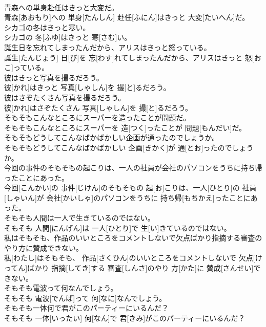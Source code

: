 \documentclass[8pt]{extreport}
\begin{document}
\begin{CJK}{UTF8}{min}
\\	青森への単身赴任はきっと大変だ。	
\\	青森[あおもり]への 単身[たんしん] 赴任[ふにん]はきっと 大変[たいへん]だ。
\\	シカゴの冬はきっと寒い。	
\\	シカゴの 冬[ふゆ]はきっと 寒[さむ]い。
\\	誕生日を忘れてしまったんだから、アリスはきっと怒っている。	
\\	誕生[たんじょう] 日[び]を 忘[わす]れてしまったんだから、アリスはきっと 怒[おこ]っている。
\\	彼はきっと写真を撮るだろう。	
\\	彼[かれ]はきっと 写真[しゃしん]を 撮[と]るだろう。
\\	彼はさぞたくさん写真を撮るだろう。	
\\	彼[かれ]はさぞたくさん 写真[しゃしん]を 撮[と]るだろう。
\\	そもそもこんなところにスーパーを造ったことが問題だ。	
\\	そもそもこんなところにスーパーを 造[つく]ったことが 問題[もんだい]だ。
\\	そもそもどうしてこんなばかばかしい企画が通ったのでしょうか。	
\\	そもそもどうしてこんなばかばかしい 企画[きかく]が 通[とお]ったのでしょうか。
\\	今回の事件のそもそもの起こりは、一人の社員が会社のパソコンをうちに持ち帰ったことにあった。	
\\	今回[こんかい]の 事件[じけん]のそもそもの 起[お]こりは、一人[ひとり]の 社員[しゃいん]が 会社[かいしゃ]のパソコンをうちに 持ち帰[もちかえ]ったことにあった。
\\	そもそも人間は一人で生きているのではない。	
\\	そもそも 人間[にんげん]は 一人[ひとり]で 生[い]きているのではない。
\\	私はそもそも、作品のいいところをコメントしないで欠点ばかり指摘する審査のやり方に賛成できない。	
\\	私[わたし]はそもそも、 作品[さくひん]のいいところをコメントしないで 欠点[けってん]ばかり 指摘[してき]する 審査[しんさ]のやり 方[かた]に 賛成[さんせい]できない。
\\	そもそも電波って何なんでしょう。	
\\	そもそも 電波[でんぱ]って 何[なに]なんでしょう。
\\	そもそも一体何で君がこのパーティーにいるんだ？	
\\	そもそも 一体[いったい] 何[なん]で 君[きみ]がこのパーティーにいるんだ？

\end{CJK}
\end{document}
